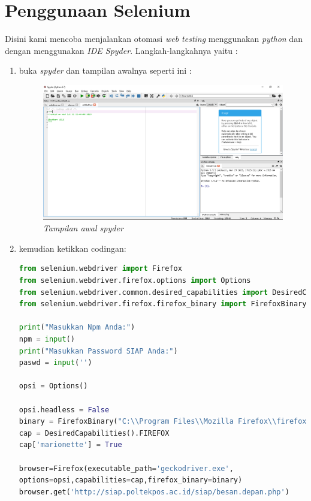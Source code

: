 \section{Penggunaan Selenium}
\par Disini kami mencoba menjalankan otomasi \textit{web testing} menggunakan \textit{python} dan dengan menggunakan \textit{IDE Spyder}.
Langkah-langkahnya yaitu :
\begin{enumerate}
\item buka \textit{spyder} dan tampilan awalnya seperti ini :
	\begin{figure}[H]
    	\centering
    	\includegraphics[scale=0.3]{Figures/figures/awalspy.png}
    	\caption{\textit{Tampilan awal spyder}}
    	\label{CLI}
	\end{figure}
	
\item kemudian ketikkan codingan:
\begin{lstlisting}[language=Python]
from selenium.webdriver import Firefox
from selenium.webdriver.firefox.options import Options
from selenium.webdriver.common.desired_capabilities import DesiredCapabilities
from selenium.webdriver.firefox.firefox_binary import FirefoxBinary

print("Masukkan Npm Anda:")
npm = input()
print("Masukkan Password SIAP Anda:")
paswd = input('')

opsi = Options()

opsi.headless = False
binary = FirefoxBinary("C:\\Program Files\\Mozilla Firefox\\firefox.exe")
cap = DesiredCapabilities().FIREFOX
cap['marionette'] = True

browser=Firefox(executable_path='geckodriver.exe',
options=opsi,capabilities=cap,firefox_binary=binary)
browser.get('http://siap.poltekpos.ac.id/siap/besan.depan.php')


\end{lstlisting}
\end{enumerate}
